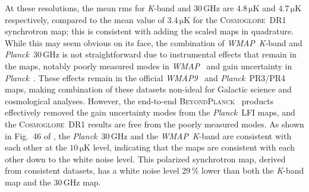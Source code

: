 \documentclass[twocolumn]{../../common/aa}
\def\WMAP{\emph{WMAP}}
\def\WMAPnine{\emph{WMAP9}}
\def\Planck{\emph{Planck}}
\def\commanderthree{\texttt{Commander3}}
\newcommand{\bp}{\textsc{BeyondPlanck}}
\newcommand{\cosmoglobe}{\textsc{Cosmoglobe}}
\newcommand{\K}[0]{\textit K}
\begin{document}
At these resolutions, the mean rms for \K-band and 30\,GHz are $4.8\,\mathrm{\mu K}$ and $4.7\,\mathrm{\mu K}$ respectively, compared to the mean value of $3.4\,\mathrm{\mu K}$ for the \cosmoglobe\ DR1 synchrotron map; this is consistent with adding the scaled maps in quadrature.  While this may seem obvious on its face,  the combination of \WMAP\ \K-band and \Planck\ 30\,GHz is not straightforward due to instrumental effects that remain in the maps, notably poorly measured modes in \WMAP\ \citep{bennett2012,weiland:2018} and gain uncertainty in \Planck\ \citep{planck2016-l02}. These effects remain in the official \WMAPnine\ \citep{bennett2012} and \Planck\ PR3/PR4 \citep{planck2016-l02,planck2020-LVII} maps, making combination of these datasets non-ideal for Galactic science and cosmological analyses. However, the end-to-end \bp\ \citep{bp01} products effectively removed the gain uncertainty modes from the \Planck\ LFI maps, and the \cosmoglobe\ DR1 results \citep{watts2023_dr1} are free from the poorly measured modes. As shown in Fig.~46 of \citet{watts2023_dr1}, the \Planck\ 30\,GHz and the \WMAP\ \K-band are consistent with each other at the $10\,\mathrm{\mu K}$ level, indicating that the maps are consistent with each other down to the white noise level. This polarized synchrotron map, derived from consistent datasets, has a white noise level 29\,\% lower than both the \K-band map and the 30\,GHz map.%




\end{document}

